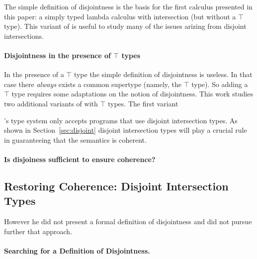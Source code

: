 The simple definition of disjointness is the basis for the first calculus 
presented in this paper: a simply typed lambda calculus with intersection 
(but without a $\top$ type). This variant of \name is useful to study many 
of the issues arizing from disjoint intersections.

\paragraph{Disjointness in the presence of $\top$ types} In the presence of a 
$\top$ type the simple definition of disjointness is useless. In that case there
\emph{always} exists a common supertype (namely, the $\top$ type). So
adding a $\top$ type requires some adaptations on the notion of disjointness. 
This work studies two additional variants of \name with $\top$ types. The first 
variant 
 

\name's type system only accepts programs that use disjoint intersection
types. As shown in Section~\ref{sec:disjoint} disjoint intersection types will
play a crucial rule in guaranteeing that the semantics is coherent.

\paragraph {Is disjoiness sufficient to ensure coherence?}

\subsection{Restoring Coherence: Disjoint Intersection Types}\label{sec:restoring}

However he did not present a formal definition of disjointness and did
not pursue further that approach. 

\paragraph{Searching for a Definition of Disjointness.}
 

